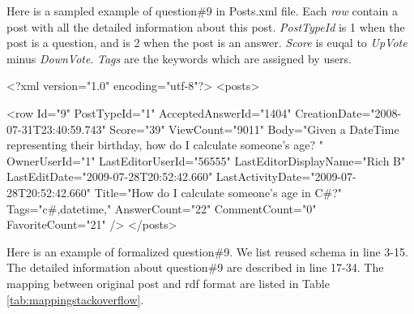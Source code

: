 \clearpage
Here is a sampled example of question\#9 in Posts.xml file. Each \textit{row} contain a post with all the detailed information about this post. \textit{PostTypeId} is 1 when the post is a question, and is 2 when the post is an answer. \textit{Score} is euqal to \textit{UpVote} minus \textit{DownVote}. \textit{Tags} are the keywords which are assigned by users.
\begin{algorithm}%
\begin{algorithmic}[1]
\State <?xml version="1.0" encoding="utf-8"?>
\State <posts>

\State \indent <row 
\State \indent \indent Id="9" 
\State \indent \indent PostTypeId="1"
\State \indent \indent AcceptedAnswerId="1404"
\State \indent \indent CreationDate="2008-07-31T23:40:59.743"
\State \indent \indent Score="39" 
\State \indent \indent ViewCount="9011" 
\State \indent \indent Body="Given a DateTime representing their birthday, how do I calculate someone's age?  " 
\State \indent \indent OwnerUserId="1"
\State \indent \indent LastEditorUserId="56555" 
\State \indent \indent LastEditorDisplayName="Rich B" 
\State \indent \indent LastEditDate="2009-07-28T20:52:42.660" 
\State \indent \indent LastActivityDate="2009-07-28T20:52:42.660" 
\State \indent \indent Title="How do I calculate someone's age in C\#?" 
\State \indent \indent Tags="c\#,datetime," AnswerCount="22" CommentCount="0" 
\State \indent \indent FavoriteCount="21" 
\State \indent />
\State </posts>

\end{algorithmic}
\end{algorithm}

Here is an example of formalized question\#9. We list reused schema in line 3-15. The detailed information about question\#9 are described in line 17-34. The mapping between original post and rdf format are listed in Table \ref{tab:mappingstackoverflow}.



